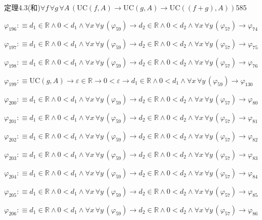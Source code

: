 \begin{fullproof}{定理4.3(和)}{$\forall f\,\forall g\,\forall A\,(\mathrm{UC}(f,A) \to \mathrm{UC}(g,A) \to \mathrm{UC}((f + g),A))$}{585}
\begin{abbrevlist}
\item $\varphi_{196} :\equiv d_{1} \in \mathbb{R} \land 0 < d_{1} \land \forall x\,\forall y\,(\varphi_{59}) \to d_{2} \in \mathbb{R} \land 0 < d_{2} \land \forall x\,\forall y\,(\varphi_{57}) \to \varphi_{74}$
\item $\varphi_{197} :\equiv d_{1} \in \mathbb{R} \land 0 < d_{1} \land \forall x\,\forall y\,(\varphi_{59}) \to d_{2} \in \mathbb{R} \land 0 < d_{2} \land \forall x\,\forall y\,(\varphi_{57}) \to \varphi_{75}$
\item $\varphi_{198} :\equiv d_{1} \in \mathbb{R} \land 0 < d_{1} \land \forall x\,\forall y\,(\varphi_{59}) \to d_{2} \in \mathbb{R} \land 0 < d_{2} \land \forall x\,\forall y\,(\varphi_{57}) \to \varphi_{76}$
\item $\varphi_{199} :\equiv \mathrm{UC}(g,A) \to \varepsilon \in \mathbb{R} \to 0 < \varepsilon \to d_{1} \in \mathbb{R} \land 0 < d_{1} \land \forall x\,\forall y\,(\varphi_{59}) \to \varphi_{130}$
\item $\varphi_{200} :\equiv d_{1} \in \mathbb{R} \land 0 < d_{1} \land \forall x\,\forall y\,(\varphi_{59}) \to d_{2} \in \mathbb{R} \land 0 < d_{2} \land \forall x\,\forall y\,(\varphi_{57}) \to \varphi_{80}$
\item $\varphi_{201} :\equiv d_{1} \in \mathbb{R} \land 0 < d_{1} \land \forall x\,\forall y\,(\varphi_{59}) \to d_{2} \in \mathbb{R} \land 0 < d_{2} \land \forall x\,\forall y\,(\varphi_{57}) \to \varphi_{81}$
\item $\varphi_{202} :\equiv d_{1} \in \mathbb{R} \land 0 < d_{1} \land \forall x\,\forall y\,(\varphi_{59}) \to d_{2} \in \mathbb{R} \land 0 < d_{2} \land \forall x\,\forall y\,(\varphi_{57}) \to \varphi_{82}$
\item $\varphi_{203} :\equiv d_{1} \in \mathbb{R} \land 0 < d_{1} \land \forall x\,\forall y\,(\varphi_{59}) \to d_{2} \in \mathbb{R} \land 0 < d_{2} \land \forall x\,\forall y\,(\varphi_{57}) \to \varphi_{83}$
\item $\varphi_{204} :\equiv d_{1} \in \mathbb{R} \land 0 < d_{1} \land \forall x\,\forall y\,(\varphi_{59}) \to d_{2} \in \mathbb{R} \land 0 < d_{2} \land \forall x\,\forall y\,(\varphi_{57}) \to \varphi_{84}$
\item $\varphi_{205} :\equiv d_{1} \in \mathbb{R} \land 0 < d_{1} \land \forall x\,\forall y\,(\varphi_{59}) \to d_{2} \in \mathbb{R} \land 0 < d_{2} \land \forall x\,\forall y\,(\varphi_{57}) \to \varphi_{85}$
\item $\varphi_{206} :\equiv d_{1} \in \mathbb{R} \land 0 < d_{1} \land \forall x\,\forall y\,(\varphi_{59}) \to d_{2} \in \mathbb{R} \land 0 < d_{2} \land \forall x\,\forall y\,(\varphi_{57}) \to \varphi_{86}$

\end{abbrevlist}
\end{fullproof}
